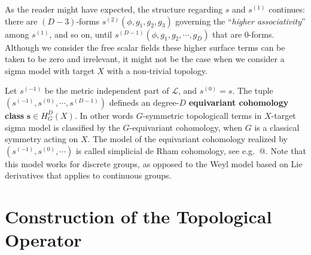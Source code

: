 \documentclass[
  letterpaper,
  DIV=11,
  numbers=noendperiod]{scrreport}
\newcounter{quartocallouttipno}
\newcommand{\quartocallouttip}[1]{\refstepcounter{quartocallouttipno}\label{#1}}
\begin{document}
\begin{tcolorbox}[enhanced jigsaw, breakable, coltitle=black, title=\textcolor{quarto-callout-tip-color}{\faLightbulb}\hspace{0.5em}{Tip \ref*{tip-equivariant}: equivariant cohomology}, arc=.35mm, leftrule=.75mm, bottomrule=.15mm, colback=white, bottomtitle=1mm, toptitle=1mm, left=2mm, titlerule=0mm, rightrule=.15mm, colbacktitle=quarto-callout-tip-color!10!white, colframe=quarto-callout-tip-color-frame, opacityback=0, toprule=.15mm, opacitybacktitle=0.6]

\quartocallouttip{tip-equivariant} 

As the reader might have expected, the structure regarding \(s\) and
\(s^{(1)}\) continues: there are \((D-3)\)-forms
\(s^{(2)}(\phi,g_1,g_2,g_3)\) governing the ``\emph{higher
associativity}'' among \(s^{(1)}\), and so on, until
\(s^{(D-1)}(\phi,g_1,g_2,\cdots,g_{D})\) that are 0-forms. Although we
consider the free scalar fields these higher surface terms can be taken
to be zero and irrelevant, it might not be the case when we consider a
sigma model with target \(X\) with a non-trivial topology.

Let \(s^{(-1)}\) be the metric independent part of \(\mathcal{L}\), and
\(s^{(0)}=s\). The tuple \((s^{(-1)},s^{(0)},\cdots,s^{(D-1)})\)
defineds an degree-\(D\) \textbf{equivariant cohomology class}
\(\mathbf{s} \in H_G^D(X)\). In other words \(G\)-symmetric topologicall
terms in \(X\)-target sigma model is classified by the \(G\)-equivariant
cohomology, when \(G\) is a classical symmetry acting on \(X\). The
model\footnotemark{} of the equivariant cohomology realized by
\((s^{(-1)},s^{(0)},\cdots)\) is called simplicial de Rham cohomology,
see e.g.~@. Note that this model works for discrete groups, as opposed
to the Weyl model based on Lie derivatives that applies to continuous
groups.

\end{tcolorbox}


\section{Construction of the Topological
Operator}\label{construction-of-the-topological-operator}
\end{document}
